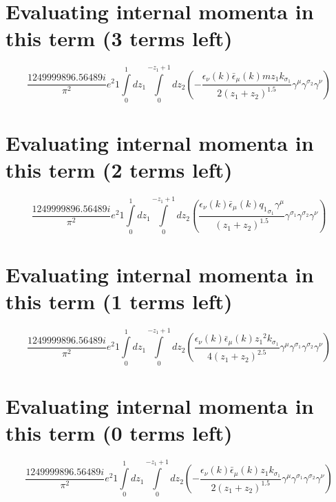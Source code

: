 \section*{Evaluating internal momenta in this term (3 terms left)}
\begin{dmath}\frac{1249999896.56489 i}{\pi^{2}} e^{2}1\int\limits_{ 0 }^{ 1 } d{ z_{ 1 } }\int\limits_{ 0 }^{ - { z_{ 1 } } + 1 } d{ z_{ 2 } }\left(- \frac{\epsilon_{ \nu }({ k }) \bar{\epsilon}_{ \mu }({ k }) m { z_{ 1 } } { { k }_{ \sigma_1 } }}{2 \left({ z_{ 1 } } + { z_{ 2 } }\right)^{1.5}} { \gamma^{ \mu } } { \gamma^{ \sigma_2 } } { \gamma^{ \nu } }\right)\end{dmath}
\section*{Evaluating internal momenta in this term (2 terms left)}
\begin{dmath}\frac{1249999896.56489 i}{\pi^{2}} e^{2}1\int\limits_{ 0 }^{ 1 } d{ z_{ 1 } }\int\limits_{ 0 }^{ - { z_{ 1 } } + 1 } d{ z_{ 2 } }\left(\frac{\epsilon_{ \nu }({ k }) \bar{\epsilon}_{ \mu }({ k }) { { q_1 }_{ \sigma_1 } } { \gamma^{ \mu } }}{\left({ z_{ 1 } } + { z_{ 2 } }\right)^{1.5}} { \gamma^{ \sigma_1 } } { \gamma^{ \sigma_2 } } { \gamma^{ \nu } }\right)\end{dmath}
\section*{Evaluating internal momenta in this term (1 terms left)}
\begin{dmath}\frac{1249999896.56489 i}{\pi^{2}} e^{2}1\int\limits_{ 0 }^{ 1 } d{ z_{ 1 } }\int\limits_{ 0 }^{ - { z_{ 1 } } + 1 } d{ z_{ 2 } }\left(\frac{\epsilon_{ \nu }({ k }) \bar{\epsilon}_{ \mu }({ k }) { z_{ 1 } }^{2} { { k }_{ \sigma_1 } }}{4 \left({ z_{ 1 } } + { z_{ 2 } }\right)^{2.5}} { \gamma^{ \mu } } { \gamma^{ \sigma_1 } } { \gamma^{ \sigma_2 } } { \gamma^{ \nu } }\right)\end{dmath}
\section*{Evaluating internal momenta in this term (0 terms left)}
\begin{dmath}\frac{1249999896.56489 i}{\pi^{2}} e^{2}1\int\limits_{ 0 }^{ 1 } d{ z_{ 1 } }\int\limits_{ 0 }^{ - { z_{ 1 } } + 1 } d{ z_{ 2 } }\left(- \frac{\epsilon_{ \nu }({ k }) \bar{\epsilon}_{ \mu }({ k }) { z_{ 1 } } { { k }_{ \sigma_1 } }}{2 \left({ z_{ 1 } } + { z_{ 2 } }\right)^{1.5}} { \gamma^{ \mu } } { \gamma^{ \sigma_1 } } { \gamma^{ \sigma_2 } } { \gamma^{ \nu } }\right)\end{dmath}
